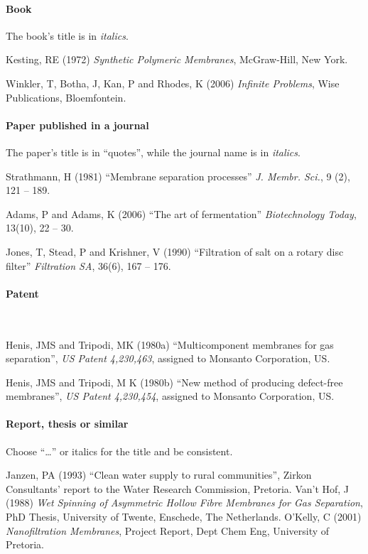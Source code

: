 \documentclass[a5paper, 10pt]{article}
\begin{document}
\paragraph{Book}
The book's title is in \emph{italics}.

Kesting, RE (1972) \textit{Synthetic Polymeric Membranes},
  McGraw-Hill, New York.

Winkler, T, Botha, J, Kan, P and Rhodes, K (2006)
  \textit{Infinite Problems}, Wise Publications, Bloemfontein.

\paragraph{Paper published in a journal}
The paper's title is in ``quotes'', while the journal name is in \emph{italics}.

Strathmann, H (1981) ``Membrane separation processes''
  \textit{J.  Membr.  Sci.}, 9 (2), 121 -- 189.

Adams, P and Adams, K (2006) ``The art of fermentation''
  \textit{Biotechnology Today}, 13(10), 22 -- 30.

Jones, T, Stead, P and Krishner, V (1990) ``Filtration of salt
  on a rotary disc filter'' \textit{Filtration SA}, 36(6), 167 -- 176.

\paragraph{Patent}
~

Henis, JMS and Tripodi, MK  (1980a) ``Multicomponent membranes
for gas separation'', \textit{US Patent 4,230,463}, assigned to Monsanto
Corporation, US.

Henis, JMS and Tripodi, M K (1980b) ``New method of producing
  defect-free membranes'', \textit{US Patent 4,230,454}, assigned to
  Monsanto Corporation, US.

\paragraph{Report, thesis or similar}
Choose ``\dots'' or italics for the title and be consistent.

Janzen, PA (1993) ``Clean water supply to rural communities'',
  Zirkon Consultants' report to the Water Research Commission,
  Pretoria.
Van't Hof, J (1988) \textit{Wet Spinning of Asymmetric Hollow
    Fibre Membranes for Gas Separation}, PhD Thesis, University of
  Twente, Enschede, The Netherlands.
O'Kelly, C (2001) \textit{Nanofiltration Membranes}, Project
  Report, Dept Chem Eng, University of Pretoria.
\end{document}
